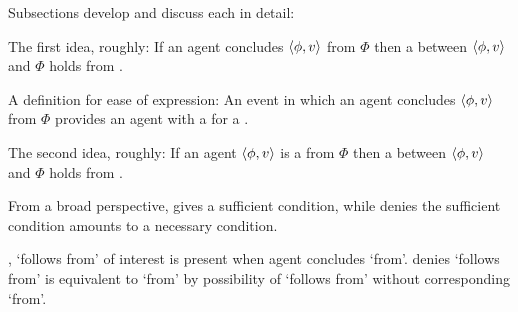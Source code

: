 \begin{note}
  Subsections develop and discuss each in detail:

  \begin{TOCEnum}
  \item

    The first idea, roughly:
    If an agent concludes \(\langle \phi, v \rangle\) from \(\Phi\) then a \ros{} between \(\langle \phi, v \rangle\) and \(\Phi\) holds from .
  \item

    A definition for ease of expression:
    An event in which an agent concludes \(\langle \phi, v \rangle\) from \(\Phi\) provides an agent with a  for a \ros{}.
  \item

    The second idea, roughly:
    If an agent \(\langle \phi, v \rangle\) is a \fc{} from \(\Phi\) then a \ros{} between \(\langle \phi, v \rangle\) and \(\Phi\) holds from .
  \end{TOCEnum}
\end{note}


\begin{note}
  From a broad perspective, \supportI{} gives a sufficient condition, while \supportII{} denies the sufficient condition amounts to a necessary condition.

  \supportI{}, `follows from' of interest is present when agent concludes `from'.
  \supportII{} denies `follows from' is equivalent to `from' by possibility of `follows from' without corresponding `from'.
\end{note}



\section{\supportI{}}
\label{cha:ros:I}


